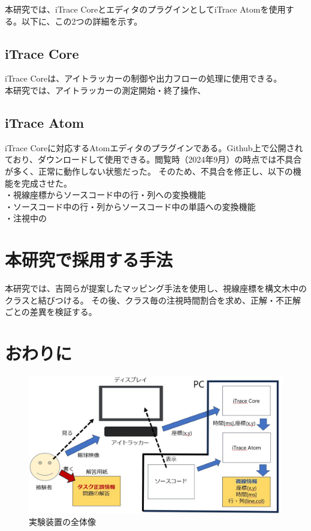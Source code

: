 \documentclass[paper=a4paper,fontsize=11pt]{jlreq}
\begin{document}
    本研究では、iTrace CoreとエディタのプラグインとしてiTrace Atomを使用する。以下に、この2つの詳細を示す。

    \subsection{iTrace Core}
      iTrace Coreは、アイトラッカーの制御や出力フローの処理に使用できる。\\
      本研究では、アイトラッカーの測定開始・終了操作、

    \subsection{iTrace Atom}
      iTrace Coreに対応するAtomエディタのプラグインである。Github上で公開されており、ダウンロードして使用できる。閲覧時（2024年9月）の時点では不具合が多く、正常に動作しない状態だった。
      そのため、不具合を修正し、以下の機能を完成させた。\\
      ・視線座標からソースコード中の行・列への変換機能\\
      ・ソースコード中の行・列からソースコード中の単語への変換機能\\
      ・注視中の


  \section{本研究で採用する手法}
    本研究では、吉岡らが提案したマッピング手法を使用し、視線座標を構文木中のクラスと結びつける。
    その後、クラス毎の注視時間割合を求め、正解・不正解ごとの差異を検証する。
  
  \section{おわりに}
    \begin{figure}[htbp]
      \centering
      \includegraphics[width=0.8\linewidth]{実験装置全体図.jpg}
      \caption{実験装置の全体像}
    \end{figure}
    \FloatBarrier
\end{document}
